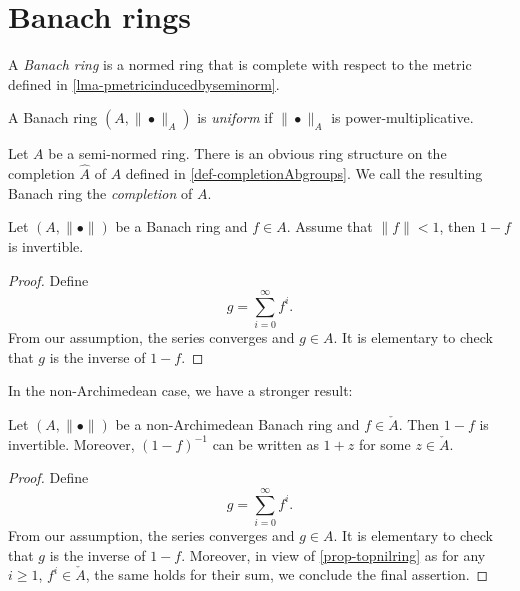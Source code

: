 \section{Banach rings}

\begin{definition}
    A \emph{Banach ring} is a normed ring that is complete with respect to the metric defined in \cref{lma-pmetricinducedbyseminorm}.
\end{definition}

\begin{definition}
    A Banach ring $(A,\|\bullet\|_A)$ is \emph{uniform} if $\|\bullet\|_A$ is power-multiplicative.
\end{definition}

\begin{definition}\label{def-completionring}
    Let $A$ be a semi-normed ring. There is an obvious ring structure on the completion $\hat{A}$ of $A$ defined in \cref{def-completionAbgroups}. We call the resulting Banach ring the \emph{completion} of $A$.
\end{definition}

\begin{proposition}\label{prop-inversesmallelementBanachring}
    Let $(A,\|\bullet\|)$ be a Banach ring and $f\in A$. Assume that $\|f\|<1$, then $1-f$ is invertible.
\end{proposition}
\begin{proof}
    Define 
    \[
        g=\sum_{i=0}^{\infty}f^i.
    \]
    From our assumption, the series converges and $g\in A$. It is elementary to check that $g$ is the inverse of $1-f$.
\end{proof}
In the non-Archimedean case, we have a stronger result:

\begin{proposition}\label{prop-inversesmallelementBanachring2}
    Let $(A,\|\bullet\|)$ be a non-Archimedean Banach ring and $f\in \check{A}$. Then $1-f$ is invertible. Moreover, $(1-f)^{-1}$ can be written as $1+z$ for some $z\in \check{A}$.
\end{proposition}
\begin{proof}
    Define 
    \[
        g=\sum_{i=0}^{\infty}f^i.
    \]
    From our assumption, the series converges and $g\in A$. It is elementary to check that $g$ is the inverse of $1-f$. Moreover, in view of \cref{prop-topnilring} as for any $i\geq 1$, $f^i\in \check{A}$, the same holds for their sum, we conclude the final assertion.
\end{proof}

